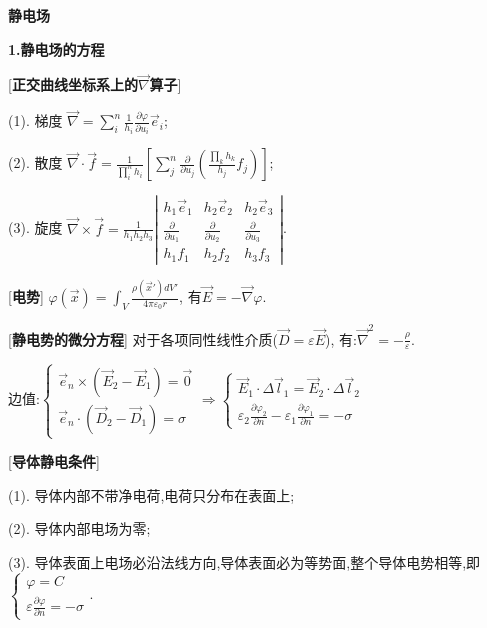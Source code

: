 


 \begin{center} 
 \Large \textbf{静电场}
\end{center}
 
\large 
\begin{center}
 \textbf{1.静电场的方程}
\end{center}

[\textbf{正交曲线坐标系上的$\vec\nabla$算子}] \par
\qquad (1). 梯度 $\vec\nabla =\sum\limits_i^n\frac{1}{h_i}\frac{\partial\varphi}{\partial u_i}\vec e_i$;\par
\qquad (2). 散度 $\vec\nabla\cdot\vec f=\frac{1}{\prod\limits_i^n h_i}\left[\sum\limits_j^n\frac{\partial}{\partial u_j}\left(\frac{\prod\limits_k h_k}{h_j}f_j\right)\right]$;\par
\qquad (3). 旋度 $\vec\nabla\times\vec f=\frac{1}{h_1h_2h_3}\left|\begin{matrix}h_1\vec e_1& h_2\vec e_2& h_2\vec e_3\\ \frac{\partial}{\partial u_1}& \frac{\partial}{\partial u_2}& \frac{\partial}{\partial u_3}\\ h_1f_1& h_2f_2& h_3f_3\end{matrix}\right|$.\par
 
[\textbf{电势}] $\varphi(\vec x)=\int_V\frac{\rho(\vec x')dV'}{4\pi\varepsilon_0r}$, 有$\vec E=-\vec\nabla \varphi$.\par

[\textbf{静电势的微分方程}] 对于各项同性线性介质($\vec D=\varepsilon\vec E$), 有:$\vec\nabla^2=-\frac{\rho}{\varepsilon}$.\par
边值:$\begin{cases}
    \vec e_n\times(\vec E_2-\vec E_1)=\vec 0 \\ 
    \vec e_n\cdot(\vec D_2-\vec D_1)=\sigma
\end{cases}\Rightarrow
\begin{cases}
   \vec E_1\cdot \Delta\vec l_1=\vec E_2\cdot\Delta\vec l_2\\
   \varepsilon_2\frac{\partial\varphi_2}{\partial n}-\varepsilon_1\frac{\partial \varphi_1}{\partial n}=-\sigma
\end{cases}$\par

[\textbf{导体静电条件}] \par
\qquad (1). 导体内部不带净电荷,电荷只分布在表面上;\par
\qquad (2). 导体内部电场为零;\par
\qquad (3). 导体表面上电场必沿法线方向,导体表面必为等势面,整个导体电势相等,即$\begin{cases}\varphi =C\\\varepsilon\frac{\partial \varphi}{\partial n}=-\sigma \end{cases}$.\par

